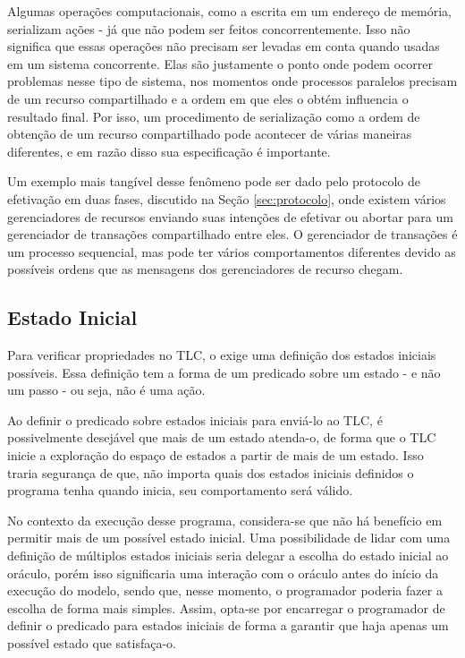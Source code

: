 Algumas operações computacionais, como a escrita em um endereço de memória,
serializam ações - já que não podem ser feitos concorrentemente. Isso não
significa que essas operações não precisam ser levadas em conta quando usadas em
um sistema concorrente. Elas são justamente o ponto onde podem ocorrer problemas
nesse tipo de sistema, nos momentos onde processos paralelos precisam de um
recurso compartilhado e a ordem em que eles o obtém influencia o resultado
final. Por isso, um procedimento de serialização como a ordem de obtenção de um
recurso compartilhado pode acontecer de várias maneiras diferentes, e em razão
disso sua especificação é importante.

Um exemplo mais tangível desse fenômeno pode ser dado pelo protocolo de
efetivação em duas fases, discutido na Seção \ref{sec:protocolo}, onde existem vários gerenciadores de recursos
enviando suas intenções de efetivar ou abortar para um gerenciador de transações
compartilhado entre eles. O gerenciador de transações é um processo sequencial,
mas pode ter vários comportamentos diferentes devido as possíveis ordens que as
mensagens dos gerenciadores de recurso chegam.

\subsection{Estado Inicial}

Para verificar propriedades no TLC, o \TLA exige uma definição dos estados
iniciais possíveis. Essa definição tem a forma de um predicado sobre um estado
- e não um passo - ou seja, não é uma ação.

Ao definir o predicado sobre estados iniciais para enviá-lo ao TLC, é
possivelmente desejável que mais de um estado atenda-o, de forma que o TLC
inicie a exploração do espaço de estados a partir de mais de um estado. Isso
traria segurança de que, não importa quais dos estados iniciais definidos o
programa tenha quando inicia, seu comportamento será válido.

No contexto da execução desse programa, considera-se que não há benefício em
permitir mais de um possível estado inicial. Uma possibilidade de lidar com uma
definição de múltiplos estados iniciais seria delegar a escolha do estado
inicial ao oráculo, porém isso significaria uma interação com o oráculo antes do
início da execução do modelo, sendo que, nesse momento, o programador poderia
fazer a escolha de forma mais simples. Assim, opta-se por encarregar o
programador de definir o predicado para estados iniciais de forma a garantir que
haja apenas um possível estado que satisfaça-o.

